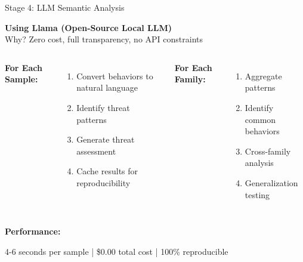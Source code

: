 \documentclass[11pt,aspectratio=16:9]{beamer}
\begin{document}
\begin{frame}{Stage 4: LLM Semantic Analysis}
  \vspace{0.3cm}
  \begin{tcolorbox}[colback=accent3!10, colframe=accent3, boxrule=2pt]
    {\large \textbf{Using Llama (Open-Source Local LLM)}}\\
    {\small Why? Zero cost, full transparency, no API constraints}
  \end{tcolorbox}
  
  \vspace{0.5cm}
  \begin{columns}
    \textbf{\textcolor{accent1}{For Each Sample:}}
    \begin{enumerate}
      \item Convert behaviors to natural language
      \item Identify threat patterns
      \item Generate threat assessment
      \item Cache results for reproducibility
    \end{enumerate}
    
    \textbf{\textcolor{accent1}{For Each Family:}}
    \begin{enumerate}
      \item Aggregate patterns
      \item Identify common behaviors
      \item Cross-family analysis
      \item Generalization testing
    \end{enumerate}
  \end{columns}
  
  \vspace{0.5cm}
  {\small \textbf{Performance:}}\par
  {\small \textcolor{accent2}{4-6 seconds per sample} | \textcolor{accent2}{\$0.00 total cost} | \textcolor{accent2}{100\% reproducible}}
\end{frame}
\end{document}
